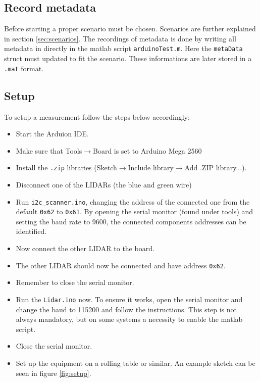 \documentclass[a4paper,twoside, 12pt]{article}
\begin{document}
\subsection{Record metadata}
Before starting a proper scenario must be chosen. Scenarios are further explained in section \ref{sec:scenarios}. The recordings of metadata is done by writing all metadata in directly in the matlab script \texttt{arduinoTest.m}. Here the \texttt{metaData} struct must updated to fit the scenario. These informations are later stored in a \texttt{.mat} format.

\subsection{Setup}
To setup a measurement follow the steps below accordingly:
\begin{itemize}
	\item Start the Arduion IDE.
	\item Make sure that Tools$\rightarrow$Board is set to Arduino Mega 2560
	\item Install the \texttt{.zip} libraries (Sketch$\rightarrow$Include library$\rightarrow$Add .ZIP library...).
	\item Disconnect one of the LIDARs (the blue and green wire)
	\item Run \texttt{i2c\_scanner.ino}, changing the address of the connected one from the default \texttt{0x62} to \texttt{0x61}. By opening the serial monitor (found under tools) and setting the baud rate to 9600, the connected components addresses can be identified.
	\item Now connect the other LIDAR to the board.
	\item The other LIDAR should now be connected and have address \texttt{0x62}.
	\item Remember to close the serial monitor.
	\item Run the \texttt{Lidar.ino} now. To ensure it works, open the serial monitor and change the baud to 115200 and follow the instructions. This step is not always mandatory, but on some systems a necessity to enable the matlab script.
	\item Close the serial monitor.
 	\item Set up the equipment on a rolling table or similar. An example sketch can be seen in figure \ref{fig:setup}.
\end{itemize}
\end{document}
